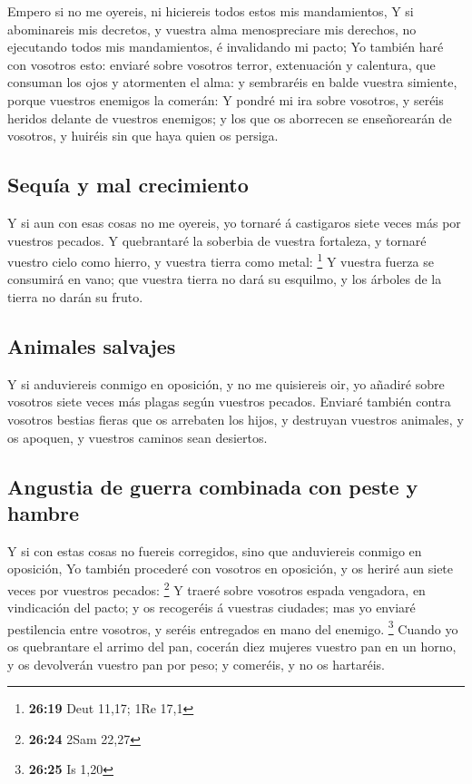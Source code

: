  Empero si no me oyereis, ni hiciereis todos estos mis
mandamientos,  Y si abominareis mis decretos, y vuestra
alma menospreciare mis derechos, no ejecutando todos mis mandamientos, é
invalidando mi pacto;  Yo también haré con vosotros esto:
enviaré sobre vosotros terror, extenuación y calentura, que consuman los
ojos y atormenten el alma: y sembraréis en balde vuestra simiente,
porque vuestros enemigos la comerán:  Y pondré mi ira sobre
vosotros, y seréis heridos delante de vuestros enemigos; y los que os
aborrecen se enseñorearán de vosotros, y huiréis sin que haya quien os
persiga.

\hypertarget{sequuxeda-y-mal-crecimiento}{%
\subsection{Sequía y mal
crecimiento}\label{sequuxeda-y-mal-crecimiento}}

 Y si aun con esas cosas no me oyereis, yo tornaré á
castigaros siete veces más por vuestros pecados.  Y
quebrantaré la soberbia de vuestra fortaleza, y tornaré vuestro cielo
como hierro, y vuestra tierra como metal: \footnote{\textbf{26:19} Deut
  11,17; 1Re 17,1}  Y vuestra fuerza se consumirá en vano;
que vuestra tierra no dará su esquilmo, y los árboles de la tierra no
darán su fruto.

\hypertarget{animales-salvajes}{%
\subsection{Animales salvajes}\label{animales-salvajes}}

 Y si anduviereis conmigo en oposición, y no me quisiereis
oir, yo añadiré sobre vosotros siete veces más plagas según vuestros
pecados.  Enviaré también contra vosotros bestias fieras
que os arrebaten los hijos, y destruyan vuestros animales, y os apoquen,
y vuestros caminos sean desiertos.

\hypertarget{angustia-de-guerra-combinada-con-peste-y-hambre}{%
\subsection{Angustia de guerra combinada con peste y
hambre}\label{angustia-de-guerra-combinada-con-peste-y-hambre}}

 Y si con estas cosas no fuereis corregidos, sino que
anduviereis conmigo en oposición,  Yo también procederé con
vosotros en oposición, y os heriré aun siete veces por vuestros pecados:
\footnote{\textbf{26:24} 2Sam 22,27}  Y traeré sobre
vosotros espada vengadora, en vindicación del pacto; y os recogeréis á
vuestras ciudades; mas yo enviaré pestilencia entre vosotros, y seréis
entregados en mano del enemigo. \footnote{\textbf{26:25} Is 1,20}
 Cuando yo os quebrantare el arrimo del pan, cocerán diez
mujeres vuestro pan en un horno, y os devolverán vuestro pan por peso; y
comeréis, y no os hartaréis.

